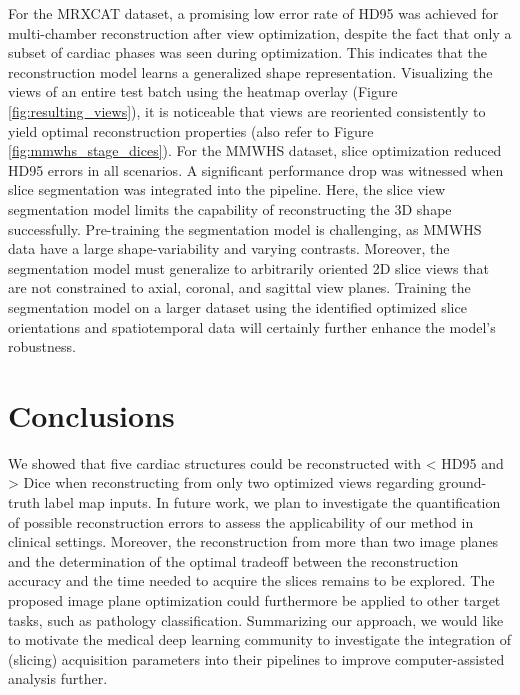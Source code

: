     For the MRXCAT dataset, a promising low error rate of  HD95 was achieved for multi-chamber reconstruction after view optimization, despite the fact that only a subset of cardiac phases was seen during optimization.
    This indicates that the reconstruction model learns a generalized shape representation. Visualizing the views of an entire test batch using the heatmap overlay (Figure\,\ref{fig:resulting_views}), it is noticeable that views are reoriented consistently to yield optimal reconstruction properties (also refer to Figure\,\ref{fig:mmwhs_stage_dices}).
    For the MMWHS dataset, slice optimization reduced HD95 errors in all scenarios.
    A significant performance drop was witnessed when slice segmentation was integrated into the pipeline. Here, the slice view segmentation model limits the capability of reconstructing the 3D shape successfully. Pre-training the segmentation model is challenging, as MMWHS data have a large shape-variability and varying contrasts. Moreover, the segmentation model must generalize to arbitrarily oriented 2D slice views that are not constrained to axial, coronal, and sagittal view planes.
    Training the segmentation model on a larger dataset using the identified optimized slice orientations and spatiotemporal data will certainly further enhance the model's robustness.

\section{Conclusions}
     We showed that five cardiac structures could be reconstructed with < HD95 and > Dice when reconstructing from only two optimized views regarding ground-truth label map inputs.
    In future work, we plan to investigate the quantification of possible reconstruction errors to assess the applicability of our method in clinical settings.
    Moreover, the reconstruction from more than two image planes and the determination of the optimal tradeoff between the reconstruction accuracy and the time needed to acquire the slices remains to be explored.
    The proposed image plane optimization could furthermore be applied to other target tasks, such as pathology classification.
    Summarizing our approach, we would like to motivate the medical deep learning community to investigate the integration of (slicing) acquisition parameters into their pipelines to improve computer-assisted analysis further.
